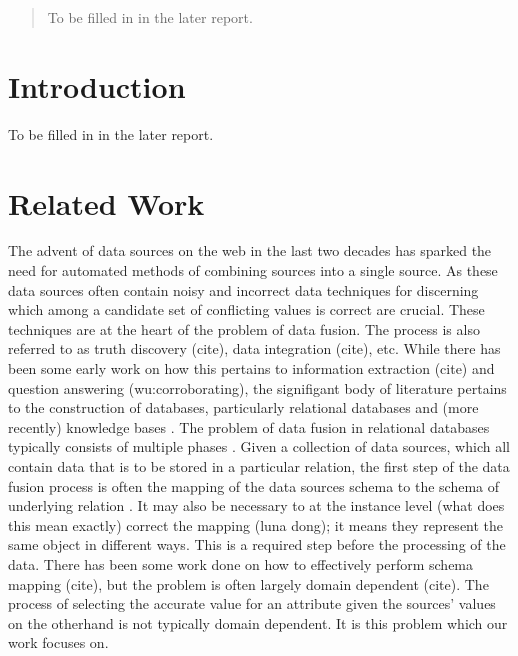 \documentclass{acm_proc_article-sp}
\begin{document}
\maketitle
\begin{abstract}
To be filled in in the later report. 
\end{abstract}




\section{Introduction}
To be filled in in the later report.


\section{Related Work}
The advent of data sources on the web in the last two decades has sparked the need for automated methods of combining sources into a single source. As these data sources often contain noisy and incorrect data techniques for discerning which among a candidate set of conflicting values is correct are crucial. These techniques are at the heart of the problem of data fusion. The process is also referred to as truth discovery (cite), data integration (cite), etc. While there has been some early work on how this pertains to information extraction (cite) and question answering (wu:corroborating), the signifigant body of literature pertains to the construction of databases, particularly relational databases and (more recently) knowledge bases \cite{dong:data}. The problem of data fusion in relational databases typically consists of multiple phases \cite{bleiholder:data} \cite{li:truth}. Given a collection of data sources, which all contain data that is to be stored in a particular relation, the first step of the data fusion process is often the mapping of the data sources schema to the schema of underlying relation \cite{bleiholder:data}. It may also be necessary to at the instance level (what does this mean exactly) correct the mapping (luna dong); it means they represent the same object in different ways. This is a required step before the processing of the data. There has been some work done on how to effectively perform schema mapping (cite), but the problem is often largely domain dependent (cite). The process of selecting the accurate value for an attribute given the sources' values on the otherhand is not typically domain dependent. It is this problem which our work focuses on.
\end{document}

